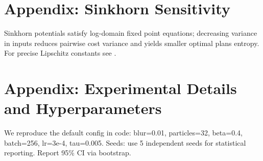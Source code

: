 \documentclass[10pt,twocolumn]{article}
\begin{document}
\section{Appendix: Sinkhorn Sensitivity}
Sinkhorn potentials satisfy log-domain fixed point equations; decreasing variance in inputs reduces pairwise cost variance and yields smaller optimal plans entropy. For precise Lipschitz constants see \cite{feydy2019interpolating}.

\section{Appendix: Experimental Details and Hyperparameters}
We reproduce the default config in code: blur=0.01, particles=32, beta=0.4, batch=256, lr=3e-4, tau=0.005. Seeds: use 5 independent seeds for statistical reporting. Report 95\% CI via bootstrap.
\end{document}
